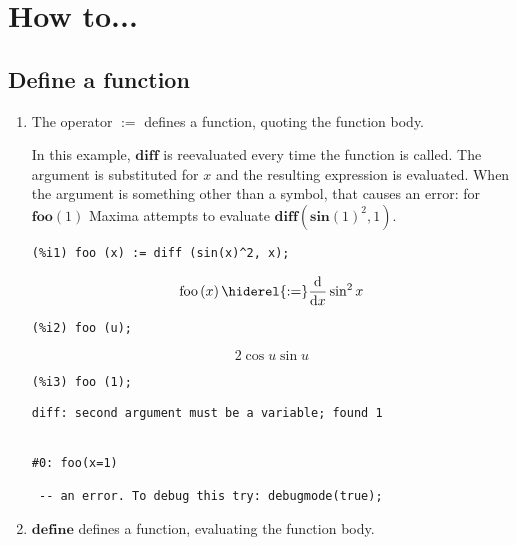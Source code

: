 \documentclass[12pt,leqno]{article}
\begin{document}
\section{How to...}

\subsection{Define a function}

\begin{enumerate}

\item The operator $\mathbf{:=}$ defines a function, quoting the function body.

In this example, $\mathbf{diff}$ is reevaluated every time the function is called.
The argument is substituted for $x$ and the resulting expression is evaluated.
When the argument is something other than a symbol, that causes an error:
for $\mathbf{foo} (1)$ Maxima attempts to evaluate $\mathbf{diff} (\mathbf{sin}(1)^2, 1)$.
\begin{verbatim}
(%i1) foo (x) := diff (sin(x)^2, x);
\end{verbatim}
\begin{dmath}[number={\(\mathop{\mathrm{\%o}_{1}}\)}]
\mathop{\mathrm{foo}}\left(x\right) \hiderel{:=} \frac{\mathrm{d}}{\mathop{\mathrm{d}x}}\sin^{2} x
\end{dmath}
\begin{verbatim}
(%i2) foo (u);
\end{verbatim}
\begin{dmath}[number={\(\mathop{\mathrm{\%o}_{2}}\)}]
2 \cos u \sin u
\end{dmath}
\begin{verbatim}
(%i3) foo (1);
\end{verbatim}
\begin{Verbatim}
diff: second argument must be a variable; found 1


#0: foo(x=1)

 -- an error. To debug this try: debugmode(true);
\end{Verbatim}


\item $\mathbf{define}$ defines a function, evaluating the function body.


\end{enumerate}
\end{document}
